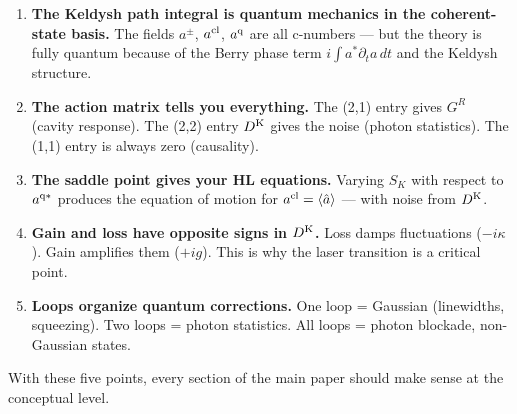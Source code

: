 \documentclass[12pt]{article}
\newcommand{\cl}{{\rm cl}}
\newcommand{\q}{{\rm q}}
\newcommand{\Keldysh}{{\rm K}}
\newcommand{\av}[1]{\langle #1 \rangle}
\providecommand{\cl}{{\rm cl}}
\providecommand{\q}{{\rm q}}
\providecommand{\Keldysh}{{\rm K}}
\begin{document}
\begin{enumerate}
  \item \textbf{The Keldysh path integral is quantum mechanics in the
    coherent-state basis.} The fields $a^\pm$, $a^\cl$, $a^\q$ are
    all c-numbers --- but the theory is fully quantum because of the
    Berry phase term $i\int a^*\partial_t a\,dt$ and the Keldysh
    structure.

  \item \textbf{The action matrix tells you everything.}
    The (2,1) entry gives $G^R$ (cavity response).
    The (2,2) entry $D^\Keldysh$ gives the noise (photon statistics).
    The (1,1) entry is always zero (causality).

  \item \textbf{The saddle point gives your HL equations.}
    Varying $S_K$ with respect to $a^{\q*}$ produces the equation
    of motion for $a^\cl = \av{\hat{a}}$ --- with noise from $D^\Keldysh$.

  \item \textbf{Gain and loss have opposite signs in $D^\Keldysh$.}
    Loss damps fluctuations ($-i\kappa$). Gain amplifies them ($+ig$).
    This is why the laser transition is a critical point.

  \item \textbf{Loops organize quantum corrections.}
    One loop = Gaussian (linewidths, squeezing).
    Two loops = photon statistics.
    All loops = photon blockade, non-Gaussian states.
\end{enumerate}

\bigskip
\noindent With these five points, every section of the main paper
should make sense at the conceptual level.
\end{document}
